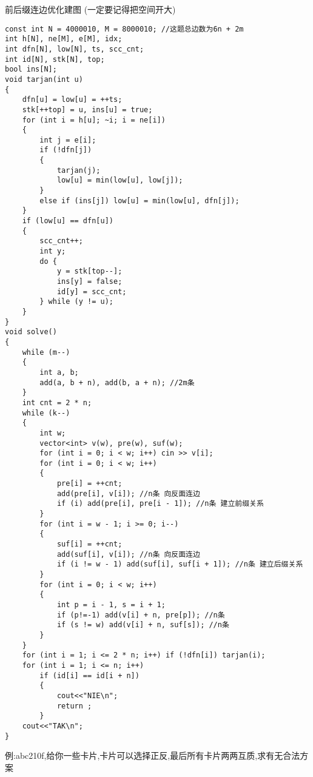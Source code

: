 \documentclass[a4paper,fontset=none]{ctexart}
\begin{document}
前后缀连边优化建图 (一定要记得把空间开大)
\begin{verbatim}
const int N = 4000010, M = 8000010; //这题总边数为6n + 2m
int h[N], ne[M], e[M], idx;
int dfn[N], low[N], ts, scc_cnt;
int id[N], stk[N], top;
bool ins[N];
void tarjan(int u)
{
    dfn[u] = low[u] = ++ts;
    stk[++top] = u, ins[u] = true;
    for (int i = h[u]; ~i; i = ne[i])
    {
        int j = e[i];
        if (!dfn[j])
        {
            tarjan(j);
            low[u] = min(low[u], low[j]);
        }
        else if (ins[j]) low[u] = min(low[u], dfn[j]);
    }
    if (low[u] == dfn[u])
    {
        scc_cnt++;
        int y;
        do {
            y = stk[top--];
            ins[y] = false;
            id[y] = scc_cnt;
        } while (y != u);
    }
}
void solve()
{
    while (m--)
    {
        int a, b;
        add(a, b + n), add(b, a + n); //2m条
    }
    int cnt = 2 * n;
    while (k--)
    {
        int w;
        vector<int> v(w), pre(w), suf(w);
        for (int i = 0; i < w; i++) cin >> v[i];
        for (int i = 0; i < w; i++)
        {
            pre[i] = ++cnt;
            add(pre[i], v[i]); //n条 向反面连边
            if (i) add(pre[i], pre[i - 1]); //n条 建立前缀关系
        }
        for (int i = w - 1; i >= 0; i--)
        {
            suf[i] = ++cnt;
            add(suf[i], v[i]); //n条 向反面连边
            if (i != w - 1) add(suf[i], suf[i + 1]); //n条 建立后缀关系
        }
        for (int i = 0; i < w; i++)
        {
            int p = i - 1, s = i + 1;
            if (p!=-1) add(v[i] + n, pre[p]); //n条
            if (s != w) add(v[i] + n, suf[s]); //n条
        }
    }
    for (int i = 1; i <= 2 * n; i++) if (!dfn[i]) tarjan(i);
    for (int i = 1; i <= n; i++)
        if (id[i] == id[i + n])
        {
            cout<<"NIE\n";
            return ;
        }
    cout<<"TAK\n";
}
\end{verbatim}

例:abc210f,给你一些卡片,卡片可以选择正反,最后所有卡片两两互质,求有无合法方案
\end{document}
